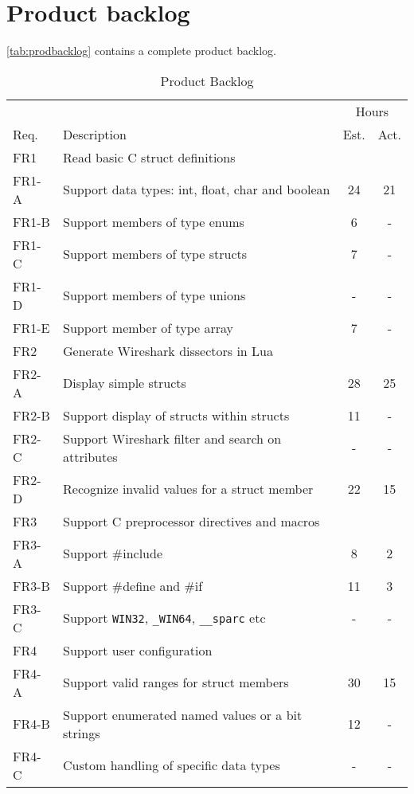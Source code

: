 \section{Product backlog}
\label{sec:prodbacklog}
\autoref{tab:prodbacklog} contains a complete product backlog.

\begin{table}[ht] \small \center
\caption{Product Backlog \label{tab:prodbacklog}}
\begin{tabularx}{\textwidth}{l X c c}
	\toprule
	& & \multicolumn{2}{c}{Hours} \\
	\cmidrule(r){3-4}
	Req. & Description & Est. & Act. \\
	\midrule
	FR1 & Read basic C struct definitions & & \\
	FR1-A & Support data types: int, float, char and boolean & 24 & 21 \\
	FR1-B & Support members of type enums & 6 & - \\
	FR1-C & Support members of type structs & 7 & - \\
	FR1-D & Support members of type unions & - & - \\
	FR1-E & Support member of type array & 7 & - \\
	\addlinespace
	FR2 & Generate Wireshark dissectors in Lua & & \\
	FR2-A & Display simple structs & 28 & 25 \\
	FR2-B & Support display of structs within structs & 11 & - \\
	FR2-C & Support Wireshark filter and search on attributes & - & - \\
	FR2-D & Recognize invalid values for a struct member & 22 & 15 \\
	\addlinespace
	FR3 & Support C preprocessor directives and macros & & \\
	FR3-A & Support \#include & 8 & 2 \\
	FR3-B & Support \#define and \#if & 11 & 3 \\
	FR3-C & Support \verb+WIN32+, \verb+_WIN64+, \verb+__sparc+ etc & - & - \\
	\addlinespace
	FR4 & Support user configuration & & \\
	FR4-A & Support valid ranges for struct members & 30 & 15 \\
	FR4-B & Support enumerated named values or a bit strings & 12 & - \\
	FR4-C & Custom handling of specific data types & - & - \\

\end{tabularx}
\end{table}

